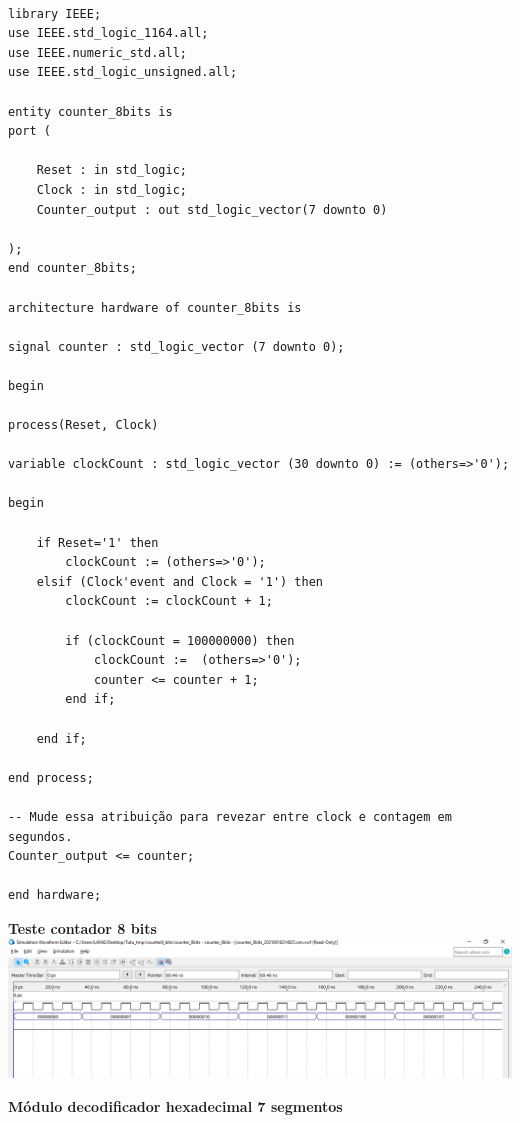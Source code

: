 \documentclass{article}
\begin{document}
\begin{verbatim}

library IEEE;
use IEEE.std_logic_1164.all;
use IEEE.numeric_std.all;
use IEEE.std_logic_unsigned.all;

entity counter_8bits is 
port (

	Reset : in std_logic;
	Clock : in std_logic;
	Counter_output : out std_logic_vector(7 downto 0)

);
end counter_8bits;

architecture hardware of counter_8bits is 

signal counter : std_logic_vector (7 downto 0);

begin

process(Reset, Clock)

variable clockCount : std_logic_vector (30 downto 0) := (others=>'0');

begin

	if Reset='1' then
		clockCount := (others=>'0');
	elsif (Clock'event and Clock = '1') then
		clockCount := clockCount + 1;
		
		if (clockCount = 100000000) then
			clockCount :=  (others=>'0');
			counter <= counter + 1;
		end if;
		
	end if;
	
end process;

-- Mude essa atribuição para revezar entre clock e contagem em segundos.
Counter_output <= counter; 

end hardware;

\end{verbatim}


\begin{center}
\textbf{Teste contador 8 bits}
\includegraphics[width=\textwidth]{img/teste_contador.png}
\end{center}


\textbf{Módulo decodificador hexadecimal 7 segmentos}
\end{document}
